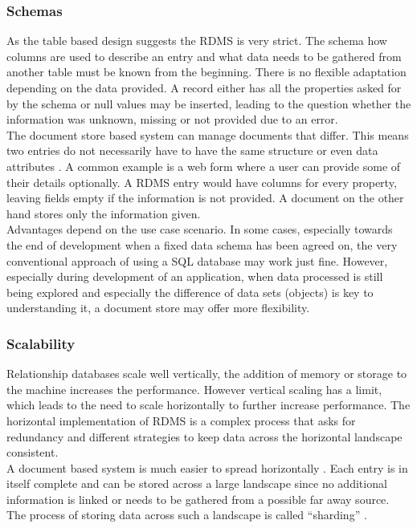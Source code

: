 \subsubsection{Schemas}
As the table based design suggests the RDMS is very strict. The schema how columns are used to describe an entry and what data needs to be gathered from another table must be known from the beginning. There is no flexible adaptation depending on the data provided. A record either has all the properties asked for by the schema or null values may be inserted, leading to the question whether the information was unknown, missing or not provided due to an error.\\
The document store based system can manage documents that differ. This means two entries do not necessarily have to have the same structure or even data attributes \parencite{amazonNoSql}\parencite{objelean}. A common example is a web form where a user can provide some of their details optionally. A RDMS entry would have columns for every property, leaving fields empty if the information is not provided. A document on the other hand stores only the information given.\\
Advantages depend on the use case scenario. In some cases, especially towards the end of development when a fixed data schema has been agreed on, the very conventional approach of using a SQL database may work just fine. However, especially during development of an application, when data processed is still being explored and especially the difference of data sets (objects) is key to understanding it, a document store may offer more flexibility.
\subsubsection{Scalability}
Relationship databases scale well vertically, the addition of memory or storage to the machine increases the performance. However vertical scaling has a limit, which leads to the need to scale horizontally to further increase performance. The horizontal implementation of RDMS is a complex process that asks for redundancy and different strategies to keep data across the horizontal landscape consistent.\\
A document based system is much easier to spread horizontally \parencite{ian2016}\parencite{objelean}. Each entry is in itself complete and can be stored across a large landscape since no additional information is linked or needs to be gathered from a possible far away source. The process of storing data across such a landscape is called \enquote{sharding} \parencite{ian2016}.
